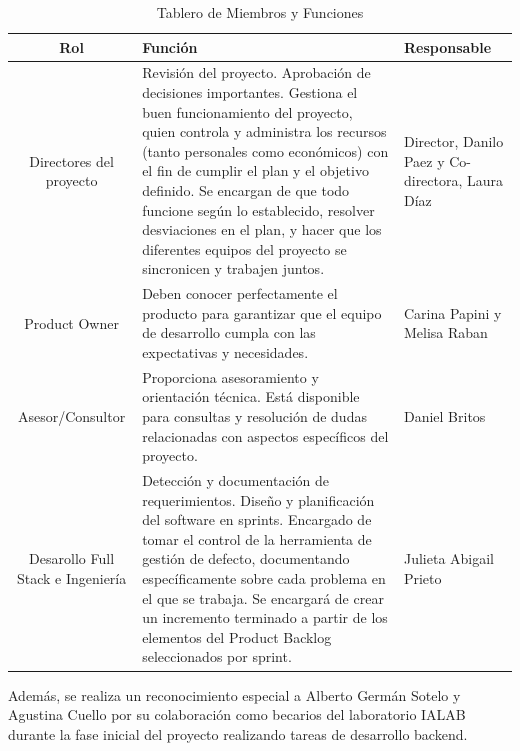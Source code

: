 \begin{table}[h]
    \centering
    \begin{tabular}{|c|p{5cm}|p{4cm}|}
        \hline
        \textbf{Rol} & \textbf{Función} & \textbf{Responsable} \\
        \hline
        Directores del proyecto
        & Revisión del proyecto. Aprobación de decisiones importantes. Gestiona el buen funcionamiento del proyecto, quien controla y administra los recursos (tanto personales como económicos) con el fin de cumplir el plan y el objetivo definido. Se encargan de que todo funcione según lo establecido, resolver desviaciones en el plan, y hacer que los diferentes equipos del proyecto se sincronicen y trabajen juntos.
        & Director, Danilo Paez y Co-directora, Laura Díaz \\
        \hline
        Product Owner
        & Deben conocer perfectamente el producto para garantizar que el equipo de desarrollo cumpla con las expectativas y necesidades.
        & Carina Papini y Melisa Raban \\
        \hline
        Asesor/Consultor
        &  Proporciona asesoramiento y orientación técnica.
        Está disponible para consultas y resolución de dudas
        relacionadas con aspectos específicos del proyecto.
        & Daniel Britos \\
        \hline
        Desarollo Full Stack e Ingeniería
        & Detección y documentación de requerimientos. Diseño y planificación del software en sprints. Encargado de tomar el control de la herramienta de gestión de defecto, documentando específicamente sobre cada problema en el que se trabaja.
        Se encargará de crear un incremento terminado a partir de los elementos del Product Backlog seleccionados por sprint.
        & Julieta Abigail Prieto\\
        \hline
    \end{tabular}
    \caption{Tablero de Miembros y Funciones}
    \label{tab:ccb}
\end{table}

Además, se realiza un reconocimiento especial a Alberto Germán Sotelo y Agustina Cuello por su colaboración como becarios del laboratorio IALAB durante la fase inicial del proyecto realizando tareas de desarrollo backend.

